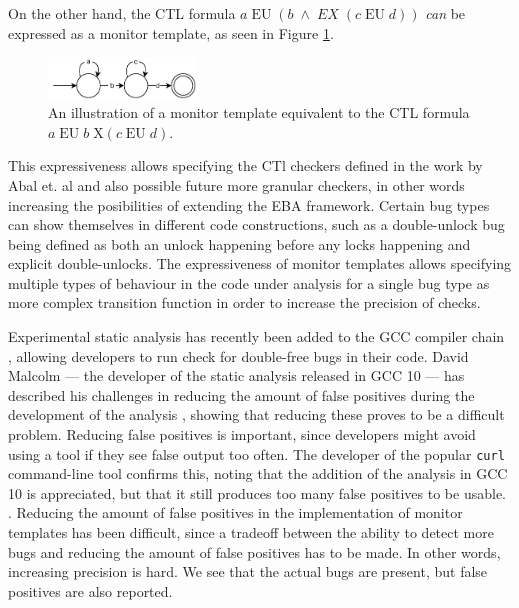 \newpar On the other hand, the CTL formula $a\;\text{EU}\;(b\;\land\;EX\;(c\;\text{EU}\;d))$ \textit{can} be expressed as a monitor template, as seen in Figure \ref{ctl-as-monitor}. 

\begin{figure}[H]
    \centering
    \includegraphics[width=0.35\textwidth]{evaluation/figures/ctl-as-monitor}
    \caption{An illustration of a monitor template equivalent to the CTL formula $a\;\text{EU}\;b\;\text{X}(c\;\text{EU}\;d)$.}
    \label{ctl-as-monitor}
\end{figure}

\newpar This expressiveness allows specifying the CTl checkers defined in the work by Abal et. al and also possible future more granular checkers, in other words increasing the posibilities of extending the EBA framework. Certain bug types can show themselves in different code constructions, such as a double-unlock bug being defined as both an unlock happening before any locks happening and explicit double-unlocks. The expressiveness of monitor templates allows specifying multiple types of behaviour in the code under analysis for a single bug type as more complex transition function in order to increase the precision of checks.

\newpar Experimental static analysis has recently been added to the GCC compiler chain \cite{gcc10}, allowing developers to run check for double-free bugs in their code. David Malcolm --- the developer of the static analysis released in GCC 10 --- has described his challenges in reducing the amount of false positives during the development of the analysis \cite{gcc10-development}, showing that reducing these proves to be a difficult problem. Reducing false positives is important, since developers might avoid using a tool if they see false output too often. The developer of the popular \texttt{curl} command-line tool confirms this, noting that the addition of the analysis in GCC 10 is appreciated, but that it still produces too many false positives to be usable. \cite{curl-static-analysis}. Reducing the amount of false positives in the implementation of monitor templates has been difficult, since a tradeoff between the ability to detect more bugs and reducing the amount of false positives has to be made. In other words, increasing precision is hard. We see that the actual bugs are present, but false positives are also reported. 

